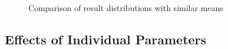 \documentclass[10pt]{article}
\begin{document}
\begin{figure}[tbp]
  \begin{center}
    \mbox{
    }
    \end{center}
    \caption{Comparison of result distributions with similar means}
    \label{fig:mean_var}
    \end{figure}

\subsection{Effects of Individual Parameters}
\end{document}
